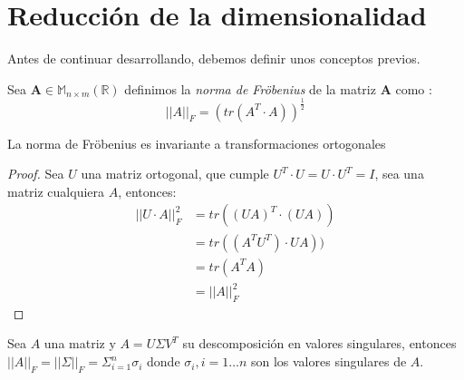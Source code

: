 \section{Reducción de la dimensionalidad}

\noindent Antes de continuar desarrollando, debemos definir unos conceptos previos. 

\begin{defi}
Sea $\textbf{A}\in \mathbb{M}_{n\times m}(\mathbb{R})$ definimos la \textit{norma de Fröbenius} de la matriz \textbf{A} como :
\begin{equation}
||A||_F=(tr(A^T\cdot A))^{\frac{1}{2}}
\end{equation}

\end{defi}

\begin{propo}
La norma de Fröbenius es invariante a transformaciones ortogonales
\end{propo}

\begin{proof}
Sea $U$ una matriz ortogonal, que cumple $U^T\cdot U=U\cdot U^T=I$, sea una matriz cualquiera $A$, entonces:
\begin{align*}\tag{2.7}
||U \cdot A||_F^2&=tr((U A)^T\cdot(U A))\\
&=tr((A^T U^T)\cdot U A))\\
&=tr(A^T A)\\
&=||A||_F^2
\end{align*}
\qedhere
\end{proof}

\begin{coro}
Sea $A$ una matriz y $A=U \Sigma V^T$ su descomposición en valores singulares, entonces $||A||_F=||\Sigma||_F=\Sigma_{i=1}^n \sigma_i$ donde $\sigma_i, i=1 \ldots n$ son los valores singulares de $A$. 
\end{coro}

\begin{teorema}

\end{teorema}




%